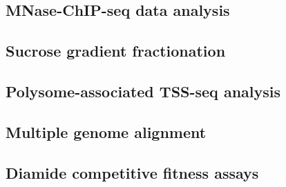 \subsection{MNase-ChIP-seq data analysis}

\subsection{Sucrose gradient fractionation}

\subsection{Polysome-associated TSS-seq analysis}

\subsection{Multiple genome alignment}

\subsection{Diamide competitive fitness assays}

\newpage

\begingroup
\singlespacing

\endgroup
